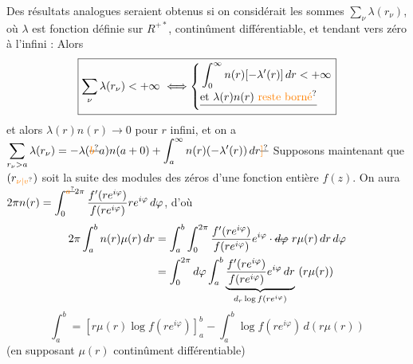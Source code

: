  Des résultats analogues seraient obtenus si
on considérait les sommes $\sum_\nu\lambda(r_\nu)$, où
$\lambda$ est fonction définie sur $R^{+*}$, continûment
différentiable,  et tendant vers zéro
 à l'infini\unsure{\}} : Alors
\[ \boxed{\displaystyle \sum_\nu\lambda(r_\nu)<+\infty\ \Longleftrightarrow\left\{\begin{aligned}&\int_0^\infty n(r)[-\lambda'(r)]\,dr<+\infty\\[-2pt]&\deleted{\text{et }\lambda(r)n(r)\ \text{\unsure{reste borné}}}\end{aligned}\right.} \]
et alors $\lambda(r)n(r)\to0$ pour $r$ infini, et
on a \quad $\displaystyle\sum_{r_\nu>a}\lambda(r_\nu)=-\lambda(\deleted{\unsure{b}}a)n(a+0)+\int_a^\infty n(r)(-\lambda'(r))\,dr\deleted{\unsure{]}}$
Supposons maintenant que $(r_{\unsure{\nu|v}})$ soit la suite des
modules des zéros d'une fonction entière $f(z)$.
On aura $\displaystyle 2\pi n(r)=\int_0^{\deleted{\unsure{a}}2\pi}\frac{f'(re^{i\varphi})}{f(re^{i\varphi})}re^{i\varphi}\,d\varphi$, d'où
\[ \begin{aligned} 2\pi\int_a^b n(r)\mu(r)\,dr
&=\int_a^b\int_0^{2\pi}\frac{f'(re^{i\varphi})}{f(re^{i\varphi})}e^{i\varphi}\cdot\deleted{d\varphi}\ r\mu(r)\,dr\,d\varphi\\
&=\int_0^{2\pi}d\varphi\int_a^b\underbrace{\frac{f'(re^{i\varphi})}{f(re^{i\varphi})}e^{i\varphi}\,dr}_{d_r\log f(re^{i\varphi})}\ (r\mu(r)) \end{aligned} \]
\[ \int_a^b=\left[r\mu(r)\log f(re^{i\varphi})\right]_a^b-\int_a^b\log f(re^{i\varphi})\,d(r\mu(r)) \]
(en supposant $\mu(r)$ continûment différentiable)

